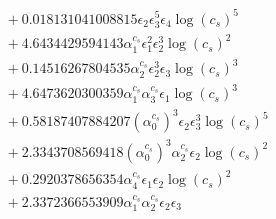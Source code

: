 \documentclass[10pt]{article}
\begin{document}
\begin{align*}
&{}  + 0.018131041008815 \epsilon_{2} \epsilon_{3}^{5} \epsilon_{4} \log{\left(c_{s} \right)}^{5} \\
&{}  + 4.6434429594143 \alpha_{1}^{c_s} \epsilon_{1}^{2} \epsilon_{2}^{3} \log{\left(c_{s} \right)}^{2} \\
&{}  + 0.14516267804535 \alpha_{2}^{c_s} \epsilon_{2}^{3} \epsilon_{3} \log{\left(c_{s} \right)}^{3} \\
&{}  + 4.6473620300359 \alpha_{1}^{c_s} \alpha_{3}^{c_s} \epsilon_{1} \log{\left(c_{s} \right)}^{3} \\
&{}  + 0.58187407884207 \left(\alpha_{0}^{c_s}\right)^{3} \epsilon_{2} \epsilon_{3}^{3} \log{\left(c_{s} \right)}^{5} \\
&{}  + 2.3343708569418 \left(\alpha_{0}^{c_s}\right)^{3} \alpha_{2}^{c_s} \epsilon_{2} \log{\left(c_{s} \right)}^{2} \\
&{}  + 0.2920378656354 \alpha_{4}^{c_s} \epsilon_{1} \epsilon_{2} \log{\left(c_{s} \right)}^{2} \\
&{}  + 2.3372366553909 \alpha_{1}^{c_s} \alpha_{2}^{c_s} \epsilon_{2} \epsilon_{3}
\end{align*}
\end{document}
